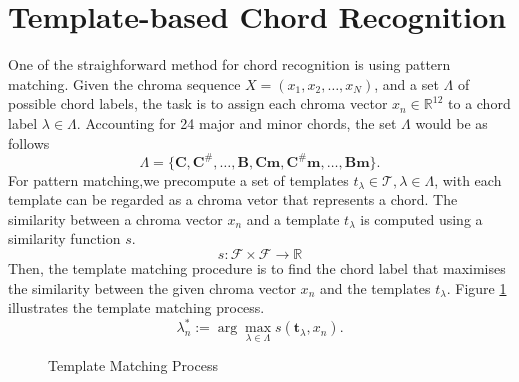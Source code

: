 \documentclass[a4paper, 9pt, twocolumn]{extarticle}
\begin{document}
\section{Template-based Chord Recognition}
\label{section:template_recognition}
One of the straighforward method for chord recognition is using pattern matching. Given the chroma sequence $X = (x_1, x_2, \ldots, x_N)$, and a set $\Lambda$ of possible chord labels, the task is to assign each chroma vector $x_n \in \mathbb{R}^{12}$ to a chord label $\lambda \in \Lambda$.
Accounting for 24 major and minor chords, the set $\Lambda$ would be as follows
\begin{equation}
    \Lambda = \{\mathbf{C, C^\#, \ldots, B, Cm, C^\#m, \ldots, Bm }\}.
\end{equation}
For pattern matching,we precompute a set of templates $t_\lambda \in \mathcal{T}, \lambda \in \Lambda$, with each template can be regarded as a chroma vetor that represents a chord. The similarity between a chroma vector $x_n$ and a template $t_\lambda$ is computed using a similarity function $s$.
\begin{equation}
    s: \mathcal{F} \times \mathcal{F} \rightarrow \mathbb{R}
\end{equation}
Then, the template matching procedure is to find the chord label that maximises the similarity between the given chroma vector $x_n$ and the templates $t_\lambda$. Figure \ref{figure:template_matching} illustrates the template matching process.
\begin{equation}
    \lambda_n^* := \arg \max_{\lambda \in \Lambda} s(\mathbf{t}_\lambda,x_n).
\end{equation}

\begin{figure}
    \caption{Template Matching Process}
    \label{figure:template_matching}
\end{figure}
\end{document}

